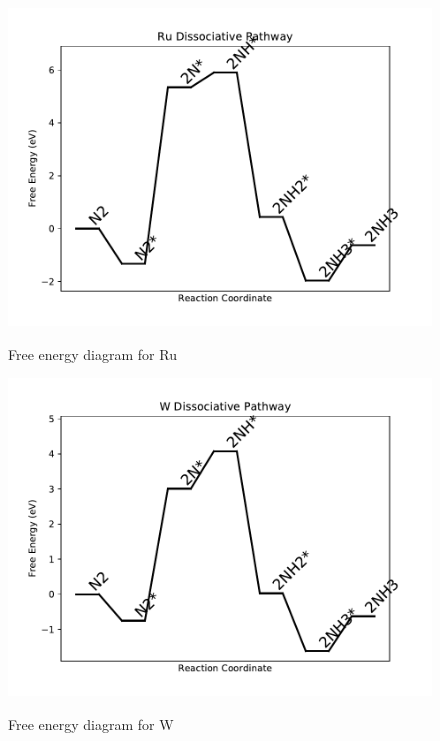 \documentclass[journal=jacsat,manuscript=article]{achemso}
\begin{document}
\begin{figure}
\includegraphics[width=1\linewidth]{data/plots/Ru_dissociative.pdf}
\label{fig:Ru_dissociative}
\caption{Free energy diagram for Ru}
\end{figure}

\newpage
\begin{figure}
\includegraphics[width=1\linewidth]{data/plots/W_dissociative.pdf}
\label{fig:W_dissociative}
\caption{Free energy diagram for W}
\end{figure}
\end{document}
